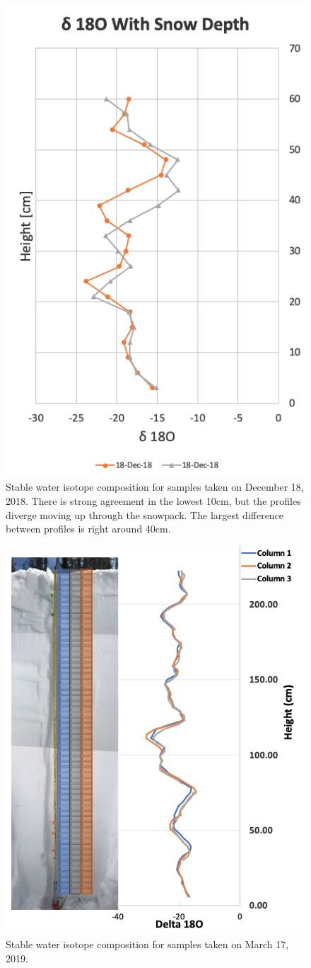 \begin{figure}[H]
    \centering
    \includegraphics[width=0.7\linewidth]{figures/Isotopes/Dec18_Isotopes.png}
    \caption{Stable water isotope composition for samples taken on December 18, 2018. There is strong agreement in the lowest 10cm, but the profiles diverge moving up through the snowpack. The largest difference between profiles is right around 40cm.}
    \label{fig:Dec18_Isotopes}
\end{figure}

\begin{figure}[H]
    \centering
    \includegraphics[width=0.7\linewidth]{figures/Isotopes/Mar17_Isotopes.png}
    \caption{Stable water isotope composition for samples taken on March 17, 2019.}
    \label{fig:Mar17_Isotopes}
\end{figure}